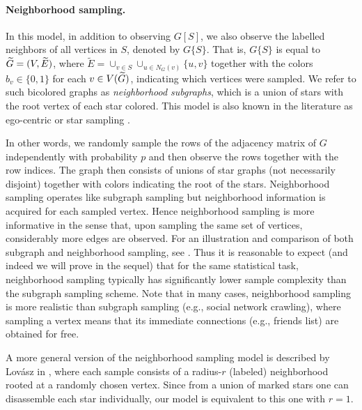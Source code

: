 \paragraph{Neighborhood sampling.} 
In this model, in addition to observing $ G[S] $, we also observe the labelled neighbors of all vertices in $ S $, denoted by $ G\{ S \} $. That is, $ G\{ S \} $ is equal to $ {\widetilde{G}} = (V, \widetilde{E}) $, where $ \widetilde{E} = \cup_{ v \in S} \cup_{ u \in N_G(v) } \{u, v\} $ 
together with the colors $ b_v \in \{0,1\}$ for each $ v \in V({\widetilde{G}}) $, indicating which vertices were sampled. We refer to such bicolored graphs as \emph{neighborhood subgraphs}, which is a union of stars with the root vertex of each star colored. This model is also known in the literature as ego-centric \cite{Handcock2010} or star sampling \cite{Capobianco72,Kolaczyk2009}.

In other words, we randomly sample the rows of the adjacency matrix of $ G $ independently with probability $ p $ and then observe the rows together with the row indices. The graph then consists of unions of star graphs (not necessarily disjoint) together with colors indicating the root of the stars. 
Neighborhood sampling operates like subgraph sampling but neighborhood information is acquired for each sampled vertex. Hence neighborhood sampling is more informative in the sense that, upon sampling the same set of vertices, considerably more edges are observed. 
For an illustration and comparison of both subgraph and neighborhood sampling, see .
Thus it is reasonable to expect (and indeed we will prove in the sequel) that for the same statistical task, neighborhood sampling typically has significantly lower sample complexity than the subgraph sampling scheme.
Note that in many cases, neighborhood sampling is more realistic than subgraph sampling (e.g., social network crawling), where sampling a vertex means that its immediate connections (e.g., friends list) are obtained for free. 


A more general version of the neighborhood sampling model is described by Lov\'asz in \cite[Section 1.7]{Lovasz12}, where each sample consists of a radius-$r$ (labeled) neighborhood rooted at a randomly chosen vertex. Since from a union of marked stars one can disassemble each star individually, our model is equivalent to this one with $r=1$.

